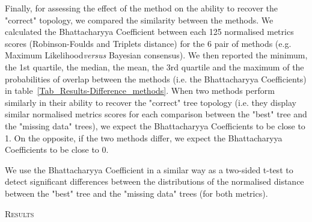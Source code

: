 \documentclass[12pt,letterpaper]{article}
\renewcommand{\section}[1]{%
\bigskip
\begin{center}
\begin{Large}
\normalfont\scshape #1
\medskip
\end{Large}
\end{center}}
\renewcommand{\subsection}[1]{%
\bigskip
\begin{center}
\begin{large}
\normalfont\itshape #1
\end{large}
\end{center}}
\begin{document}
Finally, for assessing the effect of the method on the ability to recover the "correct" topology, we compared the similarity between the methods. We calculated the Bhattacharyya Coefficient between each 125 normalised metrics scores (Robinson-Foulds and Triplets distance) for the 6 pair of methods (e.g. Maximum Likelihood\textit{versus} Bayesian consensus). We then reported the minimum, the 1st quartile, the median, the mean, the 3rd quartile and the maximum of the probabilities of overlap between the methods (i.e. the Bhattacharyya Coefficients) in table~\ref{Tab_Results-Difference_methods}. When two methods perform similarly in their ability to recover the "correct" tree topology (i.e. they display similar normalised metrics scores for each comparison between the "best" tree and the "missing data" trees), we expect the Bhattacharyya Coefficients to be close to 1. On the opposite, if the two methods differ, we expect the Bhattacharyya Coefficients to be close to 0.

We use the Bhattacharyya Coefficient in a similar way as a two-sided t-test to detect significant differences between the distributions of the normalised distance between the "best" tree and the "missing data" trees (for both metrics).

%
%

\section{Results}


\end{document}
